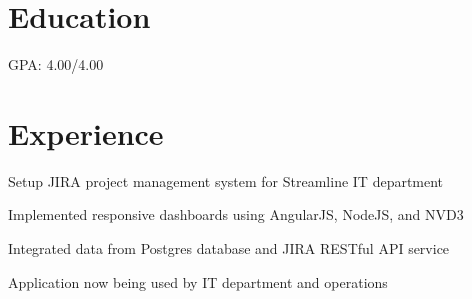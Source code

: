 \documentclass[letterpaper]{deedy-resume} %
\begin{document}
\begin{minipage}[t]{0.66\textwidth} %


\section{Education} 


\vspace{\topsep} %
\begin{tightitemize}
	\item GPA: 4.00/4.00
\end{tightitemize}

\sectionspace %



\section{Experience}


\begin{tightitemize}
\item Setup JIRA project management system for Streamline IT department
\item Implemented responsive dashboards using AngularJS, NodeJS, and NVD3
\item Integrated data from Postgres database and JIRA RESTful API service 
\item Application now being used by IT department and operations
\end{tightitemize}

\sectionspace %




\end{minipage}
\end{document}
